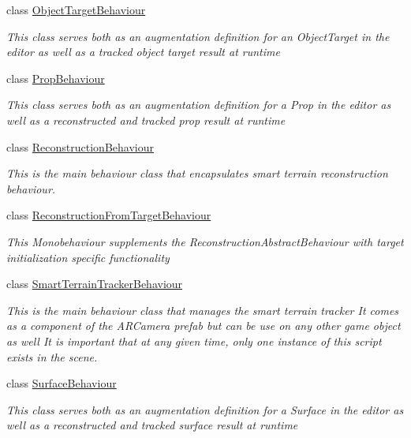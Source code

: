 \begin{DoxyCompactItemize}
class \hyperlink{class_vuforia_1_1_object_target_behaviour}{Object\+Target\+Behaviour}
\begin{DoxyCompactList}\small\item\em This class serves both as an augmentation definition for an Object\+Target in the editor as well as a tracked object target result at runtime \end{DoxyCompactList}\item 
class \hyperlink{class_vuforia_1_1_prop_behaviour}{Prop\+Behaviour}
\begin{DoxyCompactList}\small\item\em This class serves both as an augmentation definition for a Prop in the editor as well as a reconstructed and tracked prop result at runtime \end{DoxyCompactList}\item 
class \hyperlink{class_vuforia_1_1_reconstruction_behaviour}{Reconstruction\+Behaviour}
\begin{DoxyCompactList}\small\item\em This is the main behaviour class that encapsulates smart terrain reconstruction behaviour. \end{DoxyCompactList}\item 
class \hyperlink{class_vuforia_1_1_reconstruction_from_target_behaviour}{Reconstruction\+From\+Target\+Behaviour}
\begin{DoxyCompactList}\small\item\em This Monobehaviour supplements the Reconstruction\+Abstract\+Behaviour with target initialization specific functionality \end{DoxyCompactList}\item 
class \hyperlink{class_vuforia_1_1_smart_terrain_tracker_behaviour}{Smart\+Terrain\+Tracker\+Behaviour}
\begin{DoxyCompactList}\small\item\em This is the main behaviour class that manages the smart terrain tracker It comes as a component of the A\+R\+Camera prefab but can be use on any other game object as well It is important that at any given time, only one instance of this script exists in the scene. \end{DoxyCompactList}\item 
class \hyperlink{class_vuforia_1_1_surface_behaviour}{Surface\+Behaviour}
\begin{DoxyCompactList}\small\item\em This class serves both as an augmentation definition for a Surface in the editor as well as a reconstructed and tracked surface result at runtime \end{DoxyCompactList}\item 

\end{DoxyCompactItemize}
